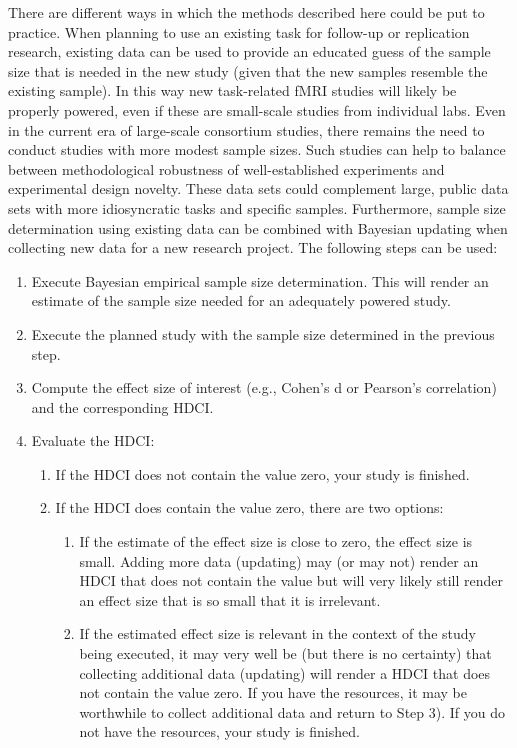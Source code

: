\documentclass[
  letterpaper,
  DIV=11,
  numbers=noendperiod]{scrartcl}
\begin{document}
There are different ways in which the methods described here could be
put to practice. When planning to use an existing task for follow-up or
replication research, existing data can be used to provide an educated
guess of the sample size that is needed in the new study (given that the
new samples resemble the existing sample). In this way new task-related
fMRI studies will likely be properly powered, even if these are
small-scale studies from individual labs. Even in the current era of
large-scale consortium studies, there remains the need to conduct
studies with more modest sample sizes. Such studies can help to balance
between methodological robustness of well-established experiments and
experimental design novelty. These data sets could complement large,
public data sets with more idiosyncratic tasks and specific samples.
Furthermore, sample size determination using existing data can be
combined with Bayesian updating when collecting new data for a new
research project. The following steps can be used:

\begin{enumerate}
\def\labelenumi{\arabic{enumi}.}
\item
  Execute Bayesian empirical sample size determination. This will render
  an estimate of the sample size needed for an adequately powered study.
\item
  Execute the planned study with the sample size determined in the
  previous step.
\item
  Compute the effect size of interest (e.g., Cohen's d or Pearson's
  correlation) and the corresponding HDCI.
\item
  Evaluate the HDCI:

  \begin{enumerate}
  \def\labelenumii{\alph{enumii}.}
  \item
    If the HDCI does not contain the value zero, your study is finished.
  \item
    If the HDCI does contain the value zero, there are two options:

    \begin{enumerate}
    \def\labelenumiii{\roman{enumiii}.}
    \item
      If the estimate of the effect size is close to zero, the effect
      size is small. Adding more data (updating) may (or may not) render
      an HDCI that does not contain the value but will very likely still
      render an effect size that is so small that it is irrelevant.
    \item
      If the estimated effect size is relevant in the context of the
      study being executed, it may very well be (but there is no
      certainty) that collecting additional data (updating) will render
      a HDCI that does not contain the value zero. If you have the
      resources, it may be worthwhile to collect additional data and
      return to Step 3). If you do not have the resources, your study is
      finished.
    \end{enumerate}
  \end{enumerate}
\end{enumerate}
\end{document}
